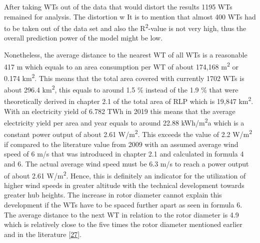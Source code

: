 \documentclass[a4paper,11pt]{article}
\begin{document}
After taking WTs out of the data that would distort the results 1195 WTs remained for analysis. The distortion w It is to mention that almost 400 WTs had to be taken out of the data set and also the R\textsuperscript{2}-value is not very high, thus the overall prediction power of the model might be low.

Nonetheless, the average distance to the nearest WT of all WTs is a reasonable 417 m which equals to an area consumption per WT of about 174,168 m\textsuperscript{2} or 0.174 km\textsuperscript{2}. This means that the total area covered with currently 1702 WTs is about 296.4 km\textsuperscript{2}, this equals to around 1.5 \% instead of the 1.9 \% that were theoretically derived in chapter 2.1 of the total area of RLP which is 19,847 km\textsuperscript{2}. With an electricity yield of 6.782 TWh in 2019 this means that the average electricity yield per area and year equals to around 22.88 kWh/m\textsuperscript{2}a which is a constant power output of about 2.61 W/m\textsuperscript{2}. This exceeds the value of 2.2 W/m\textsuperscript{2} if compared to the literature value from 2009 with an assumed average wind speed of 6 m/s that was introduced in chapter 2.1 and calculated in formula 4 and 6. The actual average wind speed must be 6.3 m/s to reach a power output of about 2.61 W/m\textsuperscript{2}. Hence, this is definitely an indicator for the utilization of higher wind speeds in greater altitude with the technical development towards greater hub heights. The increase in rotor diameter cannot explain this development if the WTs have to be spaced further apart as seen in formula 6. The average distance to the next WT in relation to the rotor diameter is 4.9 which is relatively close to the five times the rotor diameter mentioned earlier and in the literature {[}\protect\hyperlink{ref-DavidJCMacKay.2009}{27}{]}.
\end{document}
